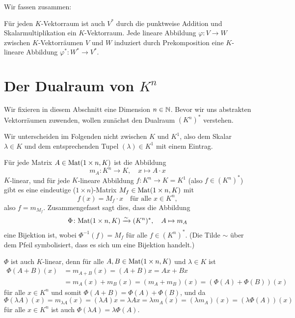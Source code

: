 \documentclass[a4paper,10pt]{article}
\begin{document}
Wir fassen zusammen:

\begin{shaded}
 Für jeden $K$-Vektorraum ist auch $V^*$ durch die punktweise Addition und Skalarmultiplikation ein $K$-Vektorraum. Jede lineare Abbildung $\varphi \colon V \to W$ zwischen $K$-Vektorräumen $V$ und $W$ induziert durch Prekomposition eine $K$-lineare Abbildung $\varphi^* \colon W^* \to V^*$.
\end{shaded}










\section{Der Dualraum von $K^n$}\label{sec: dual space of Kn}
Wir fixieren in diesem Abschnitt eine Dimension $n \in \mathbb{N}$. Bevor wir uns abstrakten Vektorräumen zuwenden, wollen zunächst den Dualraum $(K^n)^*$ verstehen.

\begin{bem}
 Wir unterscheiden im Folgenden nicht zwischen $K$ und $K^1$, also dem Skalar $\lambda \in K$ und dem entsprechenden Tupel $(\lambda) \in K^1$ mit einem Eintrag.
\end{bem}

Für jede Matrix $A \in \mathrm{Mat}(1 \times n, K)$ ist die Abbildung
\[
 m_A \colon K^n \to K, \quad x \mapsto A \cdot x
\]
$K$-linear, und für jede $K$-lineare Abbildung $f \colon K^n \to K = K^1$ (also $f \in (K^n)^*$) gibt es eine eindeutige ($1 \times n$)-Matrix $M_f \in \mathrm{Mat}(1 \times n, K)$ mit
\[
 f(x) = M_f \cdot x
 \quad \text{für alle $x \in K^n$},
\]
also $f = m_{M_f}$. Zusammengefasst sagt dies, dass die Abbildung
\[
 \Phi \colon \mathrm{Mat}(1 \times n, K) \xrightarrow{\sim} (K^n)^*, \quad A \mapsto m_A
\]
eine Bijektion ist, wobei $\Phi^{-1}(f) = M_f$ für alle $f \in (K^n)^*$. (Die Tilde $\sim$ über dem Pfeil symbolisiert, dass es sich um eine Bijektion handelt.)

$\Phi$ ist auch $K$-linear, denn für alle $A, B \in \mathrm{Mat}(1 \times n, K)$ und $\lambda \in K$ ist
\begin{align*}
 \Phi(A+B)(x)
 &= m_{A+B}(x)
 = (A+B)x
 = Ax + Bx \\
 &= m_A(x) + m_B(x)
 = (m_A+m_B)(x)
 = (\Phi(A)+\Phi(B))(x)
\end{align*}
für alle $x \in K^n$ und somit $\Phi(A+B) = \Phi(A) + \Phi(B)$, und da
\[
 \Phi(\lambda A)(x)
 = m_{\lambda A}(x)
 = (\lambda A)x
 = \lambda Ax
 = \lambda m_A(x)
 = (\lambda m_A)(x)
 = (\lambda \Phi(A))(x)
\]
für alle $x \in K^n$ ist auch $\Phi(\lambda A) = \lambda \Phi(A)$.
\end{document}
